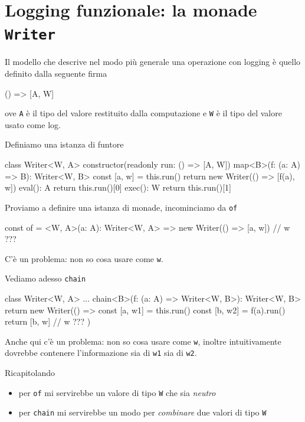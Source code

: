 \documentclass[12pt]{article}
\theoremstyle{definition}
\newenvironment{code}
  {\vspace{0.5cm} \VerbatimEnvironment\begin{typescriptcode}}
  {\end{typescriptcode} \vspace{0.2cm}}
\begin{document}
\newpage

\section{Logging funzionale: la monade \texttt{Writer}}

Il modello che descrive nel modo più generale una operazione con logging è quello definito dalla seguente firma

\begin{code}
() => [A, W]
\end{code}

ove \texttt{A} è il tipo del valore restituito dalla computazione e \texttt{W} è il tipo del valore usato come log.

Definiamo una istanza di funtore

\begin{code}
class Writer<W, A> {
  constructor(readonly run: () => [A, W]) {}
  map<B>(f: (a: A) => B): Writer<W, B> {
    const [a, w] = this.run()
    return new Writer(() => [f(a), w])
  }
  eval(): A {
    return this.run()[0]
  }
  exec(): W {
    return this.run()[1]
  }
}
\end{code}

Proviamo a definire una istanza di monade, incominciamo da \texttt{of}

\begin{code}
const of = <W, A>(a: A): Writer<W, A> =>
  new Writer(() => [a, w]) // w ???
\end{code}

C'è un problema: non so cosa usare come \texttt{w}.

Vediamo adesso \texttt{chain}

\begin{code}
class Writer<W, A> {
  ...
  chain<B>(f: (a: A) => Writer<W, B>): Writer<W, B> {
    return new Writer(() => {
      const [a, w1] = this.run()
      const [b, w2] = f(a).run()
      return [b, w] // w ???
    })
  }
}
\end{code}

Anche qui c'è un problema: non so cosa usare come \texttt{w}, inoltre intuitivamente dovrebbe contenere l'informazione sia di \texttt{w1} sia
di \texttt{w2}.

Ricapitolando

\begin{itemize}
\item per \texttt{of} mi servirebbe un valore di tipo \texttt{W} che sia \emph{neutro}
\item per \texttt{chain} mi servirebbe un modo per \emph{combinare} due valori di tipo \texttt{W}
\end{itemize}
\end{document}
